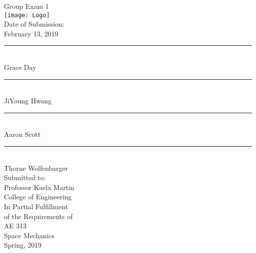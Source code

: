 

\begin{center}
  {\huge Group Exam 1}\\
  \vspace{10px}
  \texttt{[image: Logo]} \\
  Date of Submission:\\
  February 13, 2019\\
  \vspace{30px}
  \rule{300px}{0.5px} \\
  Grace Day\\
  \vspace{30px}
  \rule{300px}{0.5px} \\
  JiYoung Hwang\\
  \vspace{30px}
  \rule{300px}{0.5px} \\
  Aaron Scott\\
  \vspace{30px}
  \rule{300px}{0.5px} \\
  Thorne Wolfenbarger\\
  \vspace{30px}
  Submitted to: \\
  Professor Kaela Martin \\
  College of Engineering \\
  \vspace{40px}
  In Partial Fulfillment \\
  of the Requirements of \\
  \vspace{10px}
  AE 313 \\
  Space Mechanics \\
  Spring, 2019 \\
\end{center}
